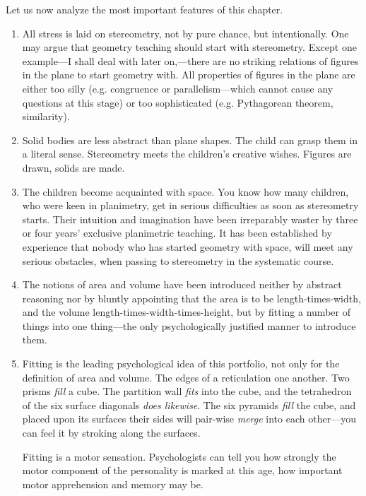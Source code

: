 Let us now analyze the most important features of this chapter.
\begin{enumerate}
\item All stress is laid on stereometry, not by pure chance, but intentionally. One may argue that geometry teaching should start with stereometry. Except one example---I shall deal with later on,---there are no striking relations of figures in the plane to start geometry with. All properties of figures in the plane are either too silly (e.g. congruence or parallelism---which cannot cause any questions at this stage) or too sophisticated (e.g. Pythagorean theorem, similarity).

\item Solid bodies are less abstract than plane shapes. The child can grasp them in a literal sense. Stereometry meets the children's creative wishes. Figures are drawn, solids are made.

\item The children become acquainted with space. You know how many children, who were keen in planimetry, get in serious difficulties as soon as stereometry starts. Their intuition and imagination have been irreparably waster by three or four years' exclusive planimetric teaching. It has been established by experience that nobody who has started geometry with space, will meet any serious obstacles, when passing to stereometry in the systematic course.

\item The notions of area and volume have been introduced neither by abstract reasoning nor by bluntly appointing that the area is to be length-times-width, and the volume length-times-width-times-height, but by fitting a number of things into one thing---the only psychologically justified manner to introduce them.

\item Fitting is the leading psychological idea of this portfolio, not only for the definition of area and volume. The edges of a reticulation one another. Two prisms {\em fill} a cube. The partition wall {\em fits} into the cube, and the tetrahedron of the six surface diagonals {\em does likewise}. The six pyramids {\em fill} the cube, and placed upon its surfaces their sides will pair-wise {\em merge} into each other---you can feel it by stroking along the surfaces.

Fitting is a motor sensation. Psychologists can tell you how strongly the motor component of the personality is marked at this age, how important motor apprehension and memory may be.


\end{enumerate}
